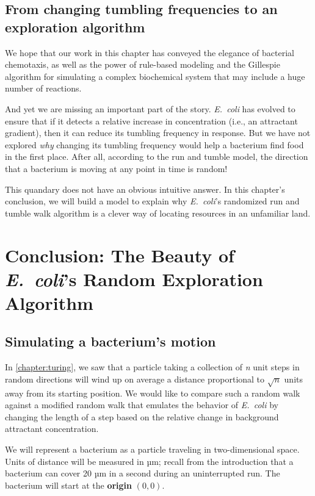 \FloatBarrier
{}
\subsection{From changing tumbling frequencies to an exploration algorithm}

We hope that our work in this chapter has conveyed the elegance of bacterial chemotaxis, as well as the power of rule-based modeling and the Gillespie algorithm for simulating a complex biochemical system that may include a huge number of reactions.

And yet we are missing an important part of the story. \textit{E.~coli} has evolved to ensure that if it detects a relative increase in concentration (i.e., an attractant gradient), then it can reduce its tumbling frequency in response. But we have not explored \textit{why} changing its tumbling frequency would help a bacterium find food in the first place. After all, according to the run and tumble model, the direction that a bacterium is moving at any point in time is random!

This quandary does not have an obvious intuitive answer. In this chapter's conclusion, we will build a model to explain why \textit{E.~coli}'s randomized run and tumble walk algorithm is a clever way of locating resources in an unfamiliar land.\\


\FloatBarrier
{}

\section{Conclusion: The Beauty of \textit{E.~coli}'s Random Exploration Algorithm}
\label{sec:conclusion}

\subsection{Simulating a bacterium's motion}

In \autoref{chapter:turing}, we saw that a particle taking a collection of \textit{n} unit steps in random directions will wind up on average a distance proportional to $\sqrt{n}$ units away from its starting position. We would like to compare such a random walk against a modified random walk that emulates the behavior of \textit{E.~coli} by changing the length of a step based on the relative change in background attractant concentration.

We will represent a bacterium as a particle traveling in two-dimensional space. Units of distance will be measured in µm; recall from the introduction that a bacterium can cover 20 µm in a second during an uninterrupted run. The bacterium will start at the \textbf{origin} $(0, 0)$.

